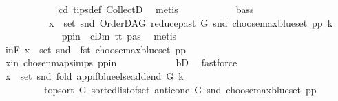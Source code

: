 \begin{isabellebody}
\ \ \ \ \ \ \ \ \ \ \ \ cd{}\ tips{\isacharunderscore}{\kern0pt}def\ CollectD\ \isamarkupfalse%
\ metis\isanewline
\ \ \ \ \ \ \ \ \isamarkupfalse%
\ \isamarkupfalse%
\ bass{\isacharcolon}{\kern0pt}\ \isanewline
\ \ \ \ \ \ \ \ \ \ {\isachardoublequoteopen}x\ {\isasymin}\ set\ {\isacharparenleft}{\kern0pt}{\isacharparenleft}{\kern0pt}snd\ {\isacharparenleft}{\kern0pt}OrderDAG\ {\isacharparenleft}{\kern0pt}reduce{\isacharunderscore}{\kern0pt}past\ G\ {\isacharparenleft}{\kern0pt}snd\ {\isacharparenleft}{\kern0pt}choose{\isacharunderscore}{\kern0pt}max{\isacharunderscore}{\kern0pt}blue{\isacharunderscore}{\kern0pt}set\ pp{\isacharparenright}{\kern0pt}{\isacharparenright}{\kern0pt}{\isacharparenright}{\kern0pt}\ k{\isacharparenright}{\kern0pt}{\isacharparenright}{\kern0pt}{\isacharparenright}{\kern0pt}{\isachardoublequoteclose}\ \isanewline
\ \ \ \ \ \ \ \ \ \ \isamarkupfalse%
\ \ pp{\isacharunderscore}{\kern0pt}in\ {}\ cDm\ tt{}\ pas\ \isamarkupfalse%
\ metis\isanewline
\ \ \ \ \ \ \ \ \isamarkupfalse%
\ \isamarkupfalse%
\ in{\isacharunderscore}{\kern0pt}F{\isacharcolon}{\kern0pt}\ {\isachardoublequoteopen}x\ {\isasymin}\ set\ {\isacharparenleft}{\kern0pt}snd\ {\isacharparenleft}{\kern0pt}\ fst\ {\isacharparenleft}{\kern0pt}{\isacharparenleft}{\kern0pt}choose{\isacharunderscore}{\kern0pt}max{\isacharunderscore}{\kern0pt}blue{\isacharunderscore}{\kern0pt}set\ pp{\isacharparenright}{\kern0pt}{\isacharparenright}{\kern0pt}{\isacharparenright}{\kern0pt}{\isacharparenright}{\kern0pt}{\isachardoublequoteclose}\ \isanewline
\ \ \ \ \ \ \ \ \ \ \isamarkupfalse%
\ x{\isacharunderscore}{\kern0pt}in\ chosen{\isacharunderscore}{\kern0pt}map{\isacharunderscore}{\kern0pt}simps{\isacharparenleft}{\kern0pt}{}{\isacharparenright}{\kern0pt}\ pp{\isacharunderscore}{\kern0pt}in\isanewline
\ \ \ \ \ \ \ \ \ \ \isamarkupfalse%
\ bD\ \isamarkupfalse%
\ fastforce\ \ \isanewline
\ \ \ \ \ \ \ \ \isamarkupfalse%
\ \isamarkupfalse%
\ {\isachardoublequoteopen}x\ {\isasymin}\ set\ {\isacharparenleft}{\kern0pt}snd\ {\isacharparenleft}{\kern0pt}fold\ {\isacharparenleft}{\kern0pt}app{\isacharunderscore}{\kern0pt}if{\isacharunderscore}{\kern0pt}blue{\isacharunderscore}{\kern0pt}else{\isacharunderscore}{\kern0pt}add{\isacharunderscore}{\kern0pt}end\ G\ k{\isacharparenright}{\kern0pt}\isanewline
\ \ \ \ \ \ \ \ \ {\isacharparenleft}{\kern0pt}top{\isacharunderscore}{\kern0pt}sort\ G\ {\isacharparenleft}{\kern0pt}sorted{\isacharunderscore}{\kern0pt}list{\isacharunderscore}{\kern0pt}of{\isacharunderscore}{\kern0pt}set\ {\isacharparenleft}{\kern0pt}anticone\ G\ {\isacharparenleft}{\kern0pt}snd\ {\isacharparenleft}{\kern0pt}choose{\isacharunderscore}{\kern0pt}max{\isacharunderscore}{\kern0pt}blue{\isacharunderscore}{\kern0pt}set\ pp{\isacharparenright}{\kern0pt}{\isacharparenright}{\kern0pt}{\isacharparenright}{\kern0pt}{\isacharparenright}{\kern0pt}{\isacharparenright}{\kern0pt}\isanewline

\end{isabellebody}
